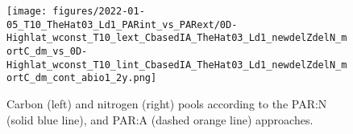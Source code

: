 \documentclass[gmd, manuscript]{copernicus}
\begin{document}
\begin{figure}[ht!]
\texttt{[image: figures/2022-01-05\_T10\_TheHat03\_Ld1\_PARint\_vs\_PARext/0D-Highlat\_wconst\_T10\_lext\_CbasedIA\_TheHat03\_Ld1\_newdelZdelN\_mortC\_dm\_vs\_0D-Highlat\_wconst\_T10\_lint\_CbasedIA\_TheHat03\_Ld1\_newdelZdelN\_mortC\_dm\_cont\_abio1\_2y.png]}
\caption{Carbon (left) and nitrogen (right) pools according to the PAR:N (solid blue line), and PAR:A (dashed orange line) approaches. \label{f.CNvars}}
\end{figure}













\end{document}
